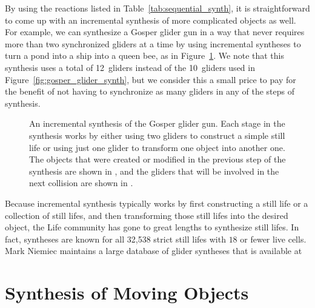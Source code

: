 By using the reactions listed in Table~\ref{tab:sequential_synth}, it is straightforward to come up with an incremental synthesis of more complicated objects as well. For example, we can synthesize a Gosper glider gun in a way that never requires more than two synchronized gliders at a time by using incremental syntheses to turn a pond into a ship into a queen bee, as in Figure~\ref{fig:gosper_sequential}. We note that this synthesis uses a total of 12~gliders instead of the 10~gliders used in Figure~\ref{fig:gosper_glider_synth}, but we consider this a small price to pay for the benefit of not having to synchronize as many gliders in any of the steps of synthesis.
\begin{figure}[!ht]
	\centering
	
	\caption{An incremental synthesis of the Gosper glider gun. Each stage in the synthesis works by either using two gliders to construct a simple still life or using just one glider to transform one object into another one. The objects that were created or modified in the previous step of the synthesis are shown in , and the gliders that will be involved in the next collision are shown in .}\label{fig:gosper_sequential}
\end{figure}

Because incremental synthesis typically works by first constructing a still life or a collection of still lifes, and then transforming those still lifes into the desired object, the Life community has gone to great lengths to synthesize still lifes. In fact, syntheses are known for all 32,538 strict still lifes with $18$ or fewer live cells. Mark Niemiec maintains a large database of glider syntheses that is available at 



\section{Synthesis of Moving Objects}\label{sec:incremental_synthesis_ships}

